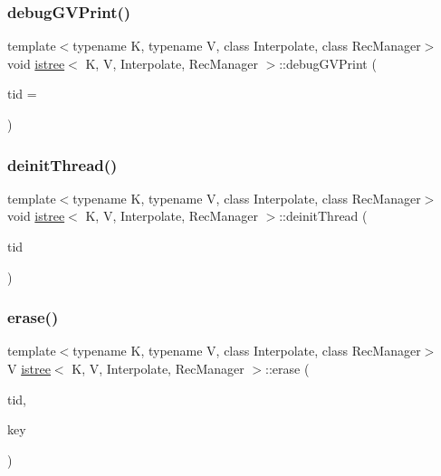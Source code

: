 \mbox{\label{classistree_ae75ac218fdeb8c2c24c54688240052c4}} 
\subsubsection{\texorpdfstring{debug\+G\+V\+Print()}{debugGVPrint()}}
{\footnotesize\ttfamily template$<$typename K, typename V, class Interpolate, class Rec\+Manager$>$ \\
void \hyperlink{classistree}{istree}$<$ K, V, Interpolate, Rec\+Manager $>$\+::debug\+G\+V\+Print (\begin{DoxyParamCaption}\item[{const int}]{tid = {} }\end{DoxyParamCaption})\hspace{0.3cm}{\ttfamily [inline]}}

\mbox{\label{classistree_a1b35670bfba65ec6133ab502ff8ef89c}} 
\subsubsection{\texorpdfstring{deinit\+Thread()}{deinitThread()}}
{\footnotesize\ttfamily template$<$typename K, typename V, class Interpolate, class Rec\+Manager$>$ \\
void \hyperlink{classistree}{istree}$<$ K, V, Interpolate, Rec\+Manager $>$\+::deinit\+Thread (\begin{DoxyParamCaption}\item[{const int}]{tid }\end{DoxyParamCaption})\hspace{0.3cm}{\ttfamily [inline]}}

\mbox{\label{classistree_aebb610663d355375bf057e7cb04433cc}} 
\subsubsection{\texorpdfstring{erase()}{erase()}}
{\footnotesize\ttfamily template$<$typename K, typename V, class Interpolate, class Rec\+Manager$>$ \\
V \hyperlink{classistree}{istree}$<$ K, V, Interpolate, Rec\+Manager $>$\+::erase (\begin{DoxyParamCaption}\item[{const int}]{tid,  }\item[{const K \&}]{key }\end{DoxyParamCaption})\hspace{0.3cm}{\ttfamily [inline]}}

